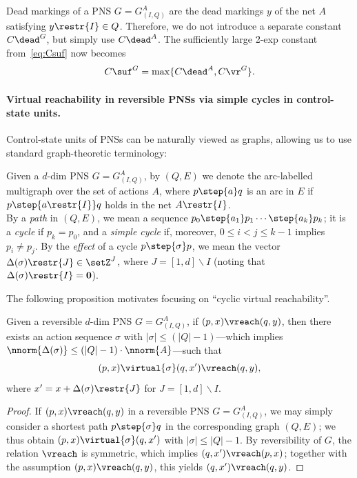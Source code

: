 \noindent
Dead markings of a PNS $G=G_{(I,Q)}^A$ are the dead markings $y$ of the
net $A$ satisfying $y\restr{I}\in Q$. Therefore, we do not introduce
a separate constant
$C\dead^G$, but simply use $C\dead^A$.  The sufficiently large 2-exp
constant from~\eqref{eq:Csuf} now becomes
\begin{equation}\label{eq:CsufG}
C\suf^G=\max\{C\dead^A,C\vr^G\}.
\end{equation}

\paragraph{Virtual reachability in reversible PNSs via simple cycles
in control-state units.}
Control-state units of PNSs can be naturally viewed as graphs, allowing us
to use standard graph-theoretic terminology:

\begin{defi}
	Given a $d$-dim PNS $G=G_{(I,Q)}^A$, by $(Q,E)$ we denote 
the arc-labelled multigraph 
over the set of actions $A$, 	where 
$p\step{a}q$ is an arc in $E$ if $p\step{a\restr{I}}q$ holds in
the net $A\restr{I}$.
\\
By a \emph{path} in $(Q,E)$, we mean a sequence
	$p_0\step{a_1}p_1\cdots \step{a_k}p_k$; it is a \emph{cycle}
	if $p_k=p_0$, and a \emph{simple
cycle} if, moreover, $0\leq i<j\leq k-1$ implies $p_i\neq p_j$. 
By the
\emph{effect} of a cycle $p\step{\sigma}p$, we mean
	the vector $\Delta(\sigma)\restr{J}\in\setZ^J$, where
	$J=[1,d]\smallsetminus I$
(noting that $\Delta(\sigma)\restr{I}=\mathbf{0}$).
\end{defi}	

\noindent
The following proposition motivates  focusing on
 ``cyclic virtual reachability''.

\begin{prop}\label{prop:quickreachcycle}
Given a reversible $d$-dim PNS $G=G_{(I,Q)}^A$, if $(p,x)\vreach (q,y)$, then
there exists an action sequence $\sigma$ with $|\sigma|\leq
	(|Q|-1)$---which implies $\nnorm{\Delta(\sigma)}\leq
	(|Q|-1)\cdot\nnorm{A}$---such that
	\[(p,x)\virtual{\sigma}(q,x')\vreach(q,y),\]
where $x'=x+\Delta(\sigma)\restr{J}$ for $J=[1,d]\smallsetminus I$.
\end{prop}
\begin{proof}
If $(p,x)\vreach (q,y)$ in a reversible PNS $G=G_{(I,Q)}^A$,
we may simply consider a
	shortest path $p\step{\sigma}q$ in the corresponding graph $(Q,E)$;
we thus obtain $(p,x)\virtual{\sigma}(q,x')$ with
	$|\sigma|\leq |Q|-1$.
By reversibility of $G$, the relation $\vreach$ is symmetric, which
	implies  $(q,x')\vreach(p,x)$; together with the assumption $(p,x) \vreach
(q,y)$, this yields $(q,x') \vreach (q,y)$. 
\end{proof}


